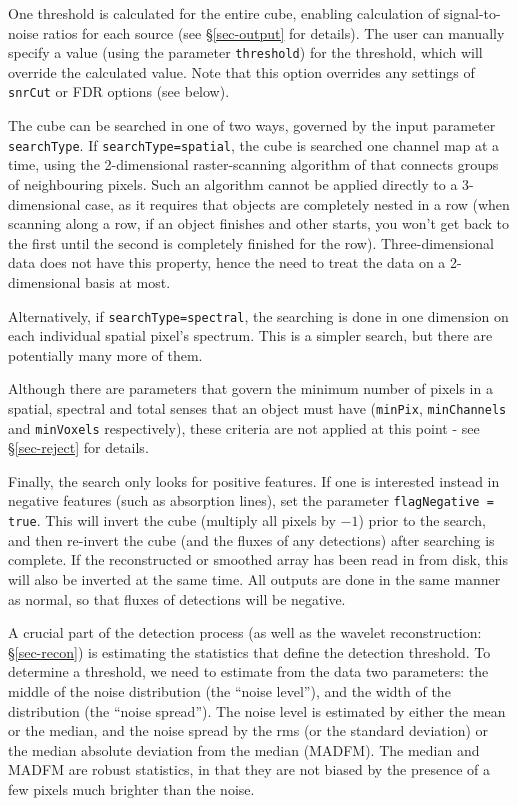 One threshold is calculated for the entire cube, enabling calculation
of signal-to-noise ratios for each source (see
\S\ref{sec-output} for details). The user can manually specify a
value (using the parameter \texttt{threshold}) for the threshold,
which will override the calculated value. Note that this option
overrides any settings of \texttt{snrCut} or FDR options (see below).

The cube can be searched in one of two ways, governed by the input
parameter \texttt{searchType}. If \texttt{searchType=spatial}, the
cube is searched one channel map at a time, using the 2-dimensional
raster-scanning algorithm of \citet{lutz80} that connects groups of
neighbouring pixels. Such an algorithm cannot be applied directly to a
3-dimensional case, as it requires that objects are completely nested
in a row (when scanning along a row, if an object finishes and other
starts, you won't get back to the first until the second is completely
finished for the row). Three-dimensional data does not have this
property, hence the need to treat the data on a 2-dimensional basis at
most.

Alternatively, if \texttt{searchType=spectral}, the searching is done
in one dimension on each individual spatial pixel's spectrum. This is
a simpler search, but there are potentially many more of them.

Although there are parameters that govern the minimum number of pixels
in a spatial, spectral and total senses that an object must have
(\texttt{minPix}, \texttt{minChannels} and \texttt{minVoxels}
respectively), these criteria are not applied at this point - see
\S\ref{sec-reject} for details.

Finally, the search only looks for positive features. If one is
interested instead in negative features (such as absorption lines),
set the parameter \texttt{flagNegative = true}. This will invert the
cube (\ie multiply all pixels by $-1$) prior to the search, and then
re-invert the cube (and the fluxes of any detections) after searching
is complete. If the reconstructed or smoothed array has been read in
from disk, this will also be inverted at the same time. All outputs
are done in the same manner as normal, so that fluxes of detections
will be negative.

\label{sec-stats}

A crucial part of the detection process (as well as the wavelet
reconstruction: \S\ref{sec-recon}) is estimating the statistics that
define the detection threshold. To determine a threshold, we need to
estimate from the data two parameters: the middle of the noise
distribution (the ``noise level''), and the width of the distribution
(the ``noise spread''). The noise level is estimated by either the
mean or the median, and the noise spread by the rms (or the standard
deviation) or the median absolute deviation from the median
(MADFM). The median and MADFM are robust statistics, in that they are
not biased by the presence of a few pixels much brighter than the
noise.

